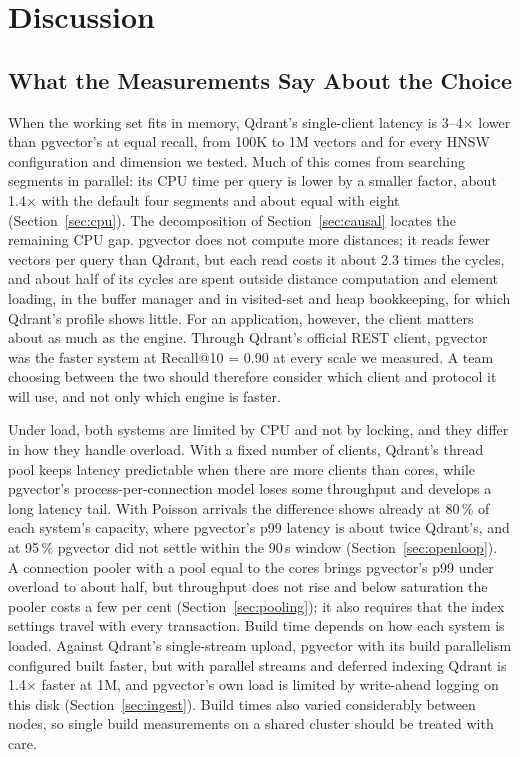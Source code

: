 \documentclass[preprint,12pt]{elsarticle}
\begin{document}
\section{Discussion}

\subsection{What the Measurements Say About the Choice}

When the working set fits in memory, Qdrant's single-client latency is 3--4$\times$ lower
than pgvector's at equal recall, from 100K to 1M vectors and for every HNSW configuration
and dimension we tested. Much of this comes from searching segments in parallel: its CPU
time per query is lower by a smaller factor, about 1.4$\times$ with the default four
segments and about equal with eight (Section~\ref{sec:cpu}). The decomposition of
Section~\ref{sec:causal} locates the remaining CPU gap. pgvector does not compute more distances; it reads fewer
vectors per query than Qdrant, but each read costs it about 2.3 times the cycles, and about half of its cycles
are spent outside distance computation and element loading, in the buffer manager and in visited-set and heap bookkeeping, for which Qdrant's profile shows little. For an application, however, the client matters about as much as the engine. Through
Qdrant's official REST client, pgvector was the faster system at Recall@10 = 0.90 at every scale we
measured. A team choosing between the two should therefore consider which client and
protocol it will use, and not only which engine is faster.

Under load, both systems are limited by CPU and not by locking, and they differ in how they handle overload. With a
fixed number of clients, Qdrant's thread pool keeps latency predictable when there are more clients than cores, while
pgvector's process-per-connection model loses some throughput and develops a long latency tail. With Poisson arrivals the
difference shows already at 80\,\% of each system's capacity, where pgvector's p99 latency is about twice Qdrant's, and at
95\,\% pgvector did not settle within the 90\,s window (Section~\ref{sec:openloop}). A connection pooler with a pool equal to
the cores brings pgvector's p99 under overload to about half, but throughput does not rise and below saturation
the pooler costs a few per cent (Section~\ref{sec:pooling}); it also requires that the index settings travel with every
transaction. Build time depends on how each system is loaded. Against Qdrant's single-stream upload, pgvector with its build
parallelism configured built faster, but with parallel streams and deferred indexing Qdrant is
1.4$\times$ faster at 1M, and pgvector's own load is limited by write-ahead logging on this
disk (Section~\ref{sec:ingest}). Build times also varied considerably between nodes, so
single build measurements on a shared cluster should be treated with care.
\end{document}
